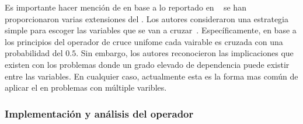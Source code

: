 Es importante hacer mención de en base a lo reportado en ~\cite{Joel:SBX1994} se han proporcionaron varias extensiones del \SBX{}.
%
Los autores consideraron una estrategia simple para escoger las variables que se van a cruzar~\cite{Joel:UNDX}.
%
Específicamente, en base a los principios del operador de cruce unifome cada vairable es cruzada con una probabilidad del $0.5$.
%
Sin embargo, los autores reconocieron las implicaciones que existen con los problemas donde un grado elevado de dependencia puede existir entre las variables.
%
En cualquier caso, actualmente esta es la forma mas común de aplicar el \SBX{} en problemas con múltiple varibles.
%

\subsubsection{Implementación y análisis del operador \SBX{}}

